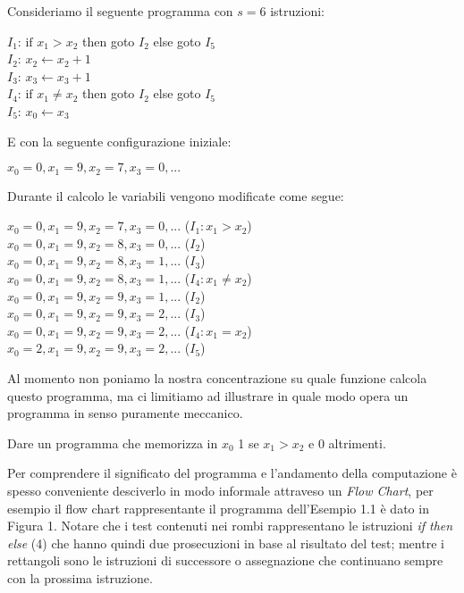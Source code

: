 \begin{esempio} Consideriamo il seguente programma con $s=6$ istruzioni:
\begin{mylisting}
$I_1$: $\textrm{if }x_1 > x_2$ then goto $I_2$ else goto $I_5$
  \\ $I_2$: $x_2 \leftarrow x_2+1$\\ $I_3$: $x_3 \leftarrow
  x_3+1$\\ $I_4$: $\textrm{if }x_1 \neq x_2$ then goto $I_2$ else goto
  $I_5$\\ $I_5$: $x_0 \leftarrow x_3$\\
\end{mylisting}
E con la seguente configurazione iniziale:
\begin{mylisting}
$x_0 = 0, x_1 = 9, x_2 = 7, x_3 = 0, ...$
\end{mylisting}
Durante il calcolo le variabili vengono modificate come segue:
\begin{mylisting}	
$x_0 = 0, x_1 = 9, x_2 = 7, x_3 = 0, ...$ ($I_1: x_1 > x_2$)\\ $x_0 =
  0, x_1 = 9, x_2 = 8, x_3 = 0, ...$ ($I_2$)\\ $x_0 = 0, x_1 = 9, x_2
  = 8, x_3 = 1, ...$ ($I_3$)\\ $x_0 = 0, x_1 = 9, x_2 = 8, x_3 = 1,
  ...$ ($I_4: x_1 \neq x_2$)\\ $x_0 = 0, x_1 = 9, x_2 = 9, x_3 = 1,
  ...$ ($I_2$)\\ $x_0 = 0, x_1 = 9, x_2 = 9, x_3 = 2, ...$
  ($I_3$)\\ $x_0 = 0, x_1 = 9, x_2 = 9, x_3 = 2, ...$ ($I_4: x_1 =
  x_2$)\\ $x_0 = 2, x_1 = 9, x_2 = 9, x_3 = 2, ...$ ($I_5$)\\
\end{mylisting}	
\end{esempio}

\begin{nota}		
Al momento non poniamo la nostra concentrazione su quale funzione
calcola questo programma, ma ci limitiamo ad illustrare in quale modo
opera un programma in senso puramente meccanico.
\end{nota}

\begin{extra}
Dare un programma che memorizza in $x_0$ 1 se $x_1 > x_2$ e 0
altrimenti.
\end{extra}	

Per comprendere il significato del programma e l'andamento della
computazione \`e spesso conveniente desciverlo in modo informale
attraveso un \emph{Flow Chart}, per esempio il flow chart
rappresentante il programma dell'Esempio 1.1 \`e dato in Figura
1. Notare che i test contenuti nei rombi rappresentano le istruzioni
\emph{if then else} (4) che hanno quindi due prosecuzioni in base al
risultato del test; mentre i rettangoli sono le istruzioni di
successore o assegnazione che continuano sempre con la prossima
istruzione.
		
